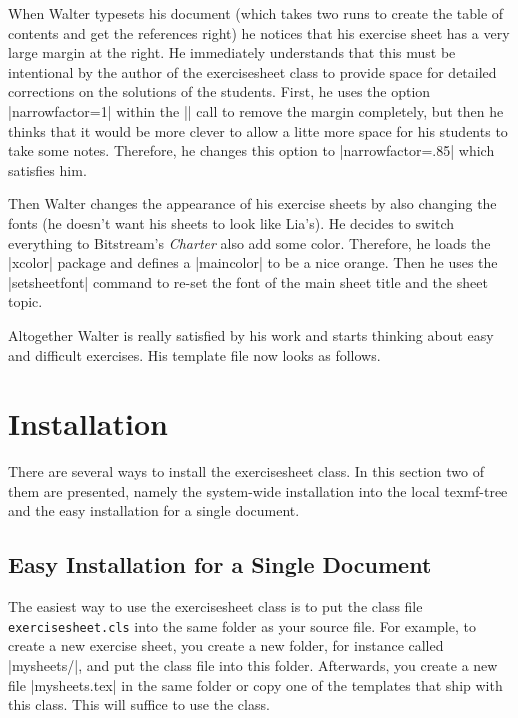 \documentclass[a4paper,fleqn]{report}
\def\exercisesheet{{exercisesheet}}
\begin{document}


\noindent When Walter typesets his document (which takes two runs to
create the table of contents and get the references right) he notices
that his exercise sheet has a very large margin at the right. He
immediately understands that this must be intentional by the author of
the \exercisesheet{} class to provide space for detailed corrections
on the solutions of the students. First, he uses the option
|narrowfactor=1| within the |\sheetconf| call to remove the margin
completely, but then he thinks that it would be more clever to allow a
litte more space for his students to take some notes. Therefore, he
changes this option to |narrowfactor=.85| which satisfies him.



\noindent Then Walter changes the appearance of his exercise sheets by
also changing the fonts (he doesn't want his sheets to look like
Lia's). He decides to switch everything to Bitstream's \emph{Charter}
also add some color. Therefore, he loads the |xcolor| package and
defines a |maincolor| to be a nice orange. Then he uses the
|setsheetfont| command to re-set the font of the main sheet title and
the sheet topic.



\noindent Altogether Walter is really satisfied by his work and starts
thinking about easy and difficult exercises. His template file now
looks as follows.




\chapter{Installation}

There are several ways to install the \exercisesheet{} class. In this
section two of them are presented, namely the system-wide installation
into the local texmf-tree and the easy installation for a single
document.


\section{Easy Installation for a Single Document}

The easiest way to use the \exercisesheet{} class is to put the class
file \lstinline[language=bash]|exercisesheet.cls| into the same folder
as your source file. For example, to create a new exercise sheet, you
create a new folder, for instance called |mysheets/|, and put the
class file into this folder.  Afterwards, you create a new file
|mysheets.tex| in the same folder or copy one of the templates that
ship with this class. This will suffice to use the class.
\end{document}
